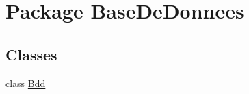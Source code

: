 \hypertarget{namespace_base_de_donnees}{}\section{Package Base\+De\+Donnees}
\label{namespace_base_de_donnees}
\subsection*{Classes}
\begin{DoxyCompactItemize}
\item 
class \hyperlink{class_base_de_donnees_1_1_bdd}{Bdd}
\end{DoxyCompactItemize}
